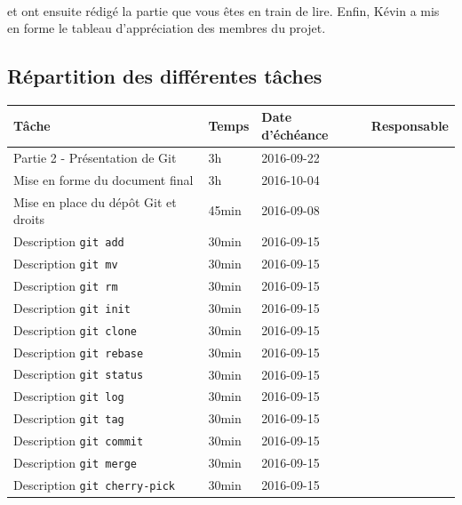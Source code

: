 \documentclass[11pt,canadien]{article}
\begin{document}
\paragraph{}\joffrey et \julien ont ensuite rédigé la partie que vous êtes en train de lire. Enfin, Kévin a mis en forme le tableau d'appréciation des membres du projet.

\FloatBarrier %
\newpage
\begin{appendices} %

\section{Répartition des différentes tâches}
\begin{tabular}{l l l l}
	\textbf{Tâche} & \textbf{Temps} & \textbf{Date d'échéance} & \textbf{Responsable}
	\\ \hline
	   Partie 2 - Présentation de Git       & 3h    & 2016-09-22 & \antoine
	\\ Mise en forme du document final      & 3h    & 2016-10-04 & \kevin
	\\ Mise en place du dépôt Git et droits & 45min & 2016-09-08 & \joffrey
	\\ Description \texttt{git add}         & 30min & 2016-09-15 & \estelle
	\\ Description \texttt{git mv}          & 30min & 2016-09-15 & \estelle
	\\ Description \texttt{git rm}          & 30min & 2016-09-15 & \estelle
	\\ Description \texttt{git init}        & 30min & 2016-09-15 & \julien
	\\ Description \texttt{git clone}       & 30min & 2016-09-15 & \julien
	\\ Description \texttt{git rebase}      & 30min & 2016-09-15 & \julien
	\\ Description \texttt{git status}      & 30min & 2016-09-15 & \valentin
	\\ Description \texttt{git log}         & 30min & 2016-09-15 & \valentin
	\\ Description \texttt{git tag}         & 30min & 2016-09-15 & \valentin
	\\ Description \texttt{git commit}      & 30min & 2016-09-15 & \joffrey
	\\ Description \texttt{git merge}       & 30min & 2016-09-15 & \joffrey
	\\ Description \texttt{git cherry-pick} & 30min & 2016-09-15 & \joffrey

\end{tabular}
\end{appendices}
\end{document}
